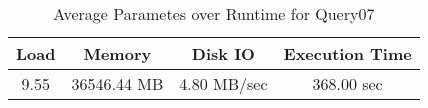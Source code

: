 \documentclass[../../main.tex]{subfiles}
\begin{document}
    \begin{table}
        \begin{center}
            \begin{tabular}{ |c|c|c|c| } 
            \hline
            Load & Memory & Disk IO & Execution Time\\
            \hline
            9.55 & 36546.44 MB & 4.80 MB/sec & 368.00 sec \\
            \hline
            \end{tabular}
            \\[1pt]
            \caption{Average Parametes over Runtime for Query07}
        \end{center}
    \end{table}
    \pagebreak
\end{document}
